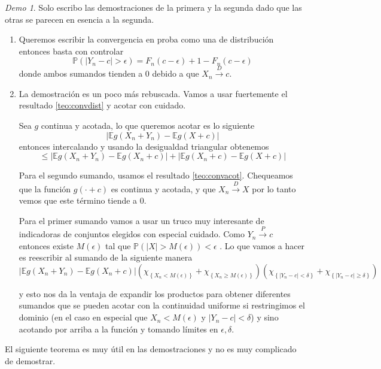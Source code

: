 \documentclass[11pt]{article}
\theoremstyle{plain} %
\theoremstyle{definition}
\theoremstyle{remark}
\newtheorem*{demo}{Demo}
\def\E{\mathbb{E}}
\def\P{\mathbb{P}}
\renewcommand\qed{\ding{110}}
\newcommand{\proba}{\overset{P}{\to}}
\newcommand{\dist}{\overset{D}{\to}}
\begin{document}
\begin{demo}
	Solo escribo las demostraciones de la primera y la segunda dado que las otras se parecen en esencia a la segunda.
	\begin{enumerate}
		\item Queremos escribir la convergencia en proba como una de distribución entonces basta con controlar 
		\[\P(\left| Y_n -c \right| > \epsilon ) = F_n(c - \epsilon) + 1 - F_n(c - \epsilon) \]
		donde ambos sumandos tienden a 0 debido a que $X_n \dist c$.
		
		\item La demostración es un poco más rebuscada. Vamos a usar fuertemente el resultado \ref{teo:convdist} y acotar con cuidado.
		
		Sea $g$ continua y acotada, lo que queremos acotar es lo siguiente
		\[ \left| \E  g(X_n + Y_n) - \E g(X + c)  \right| \]
		entonces intercalando y usando la desigualdad triangular obtenemos 
		\[ \leq \left| \E  g(X_n + Y_n) - \E g(X_n + c)  \right| + \left| \E  g(X_n + c) - \E g(X + c)  \right| \]
		
		Para el segundo sumando, usamos el resultado \ref{teo:convacot}. Chequeamos que la función $g(\cdot + c)$ es continua y acotada, y que $X_n \dist X$ por lo tanto vemos que este término tiende a 0.
		
		Para el primer sumando vamos a usar un truco muy interesante de indicadoras de conjuntos elegidos con especial cuidado. Como $Y_n \proba c$ entonces existe $M(\epsilon)$ tal que $\P\left( \left|X \right| > M(\epsilon) \right) < \epsilon  $ . Lo que vamos a hacer es reescribir al sumando de la siguiente manera
		\[ \left| \E  g(X_n + Y_n) - \E g(X_n + c)  \right| \left( \chi_{\left\lbrace X_n < M(\epsilon) \right\rbrace } + \chi_{\left\lbrace X_n \geq M(\epsilon) \right\rbrace } \right) \left( \chi_{\left\lbrace |Y_n - c| < \delta \right\rbrace } + \chi_{\left\lbrace |Y_n - c| \geq \delta \right\rbrace } \right) \]
		
		y esto nos da la ventaja de expandir los productos para obtener diferentes sumandos que se pueden acotar con la continuidad uniforme si restringimos el dominio (en el caso en especial que $X_n < M(\epsilon)$ y $|Y_n - c| < \delta $) y sino acotando por arriba a la función y tomando límites en $\epsilon, \delta$. \qed
		  
	\end{enumerate}
\end{demo}

El siguiente teorema es muy útil en las demostraciones y no es muy complicado de demostrar.
\end{document}
